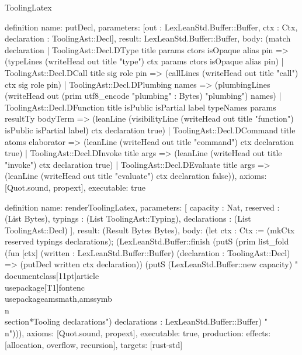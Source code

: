 \begin{lexlean}{ToolingLatex}
\begin{semanticmodule}
definition{
  name: putDecl,
  parameters: [out : LexLeanStd.Buffer::Buffer, ctx : Ctx, declaration : ToolingAst::Decl],
  result: LexLeanStd.Buffer::Buffer,
  body: (match declaration
    | ToolingAst::Decl.DType title params ctors isOpaque alias pin => (typeLines (writeHead out title "type") ctx params ctors isOpaque alias pin)
    | ToolingAst::Decl.DCall title sig role pin => (callLines (writeHead out title "call") ctx sig role pin)
    | ToolingAst::Decl.DPlumbing names => (plumbingLines (writeHead out (prim utf8_encode "plumbing" : Bytes) "plumbing") names)
    | ToolingAst::Decl.DFunction title isPublic isPartial label typeNames params resultTy bodyTerm => (leanLine (visibilityLine (writeHead out title "function") isPublic isPartial label) ctx declaration true)
    | ToolingAst::Decl.DCommand title atoms elaborator => (leanLine (writeHead out title "command") ctx declaration true)
    | ToolingAst::Decl.DInvoke title args => (leanLine (writeHead out title "invoke") ctx declaration true)
    | ToolingAst::Decl.DEvaluate title args => (leanLine (writeHead out title "evaluate") ctx declaration false)),
  axioms: [Quot.sound, propext],
  executable: true
}

definition{
  name: renderToolingLatex,
  parameters: [
    capacity : Nat,
    reserved : (List Bytes),
    typings : (List ToolingAst::Typing),
    declarations : (List ToolingAst::Decl)
  ],
  result: (Result Bytes Bytes),
  body: (let ctx : Ctx := (mkCtx reserved typings declarations); (LexLeanStd.Buffer::finish (putS (prim list_fold (fun [ctx] (written : LexLeanStd.Buffer::Buffer) (declaration : ToolingAst::Decl) => (putDecl written ctx declaration)) (putS (LexLeanStd.Buffer::new capacity) "\\documentclass[11pt]{article}\n\\usepackage[T1]{fontenc}\n\\usepackage{amsmath,amssymb}\n\\n\\section*{Tooling declarations}\n") declarations : LexLeanStd.Buffer::Buffer) "\\n"))),
  axioms: [Quot.sound, propext],
  executable: true,
  production: {effects: [allocation, overflow, recursion], targets: [rust-std]}
}
\end{semanticmodule}
\end{lexlean}
